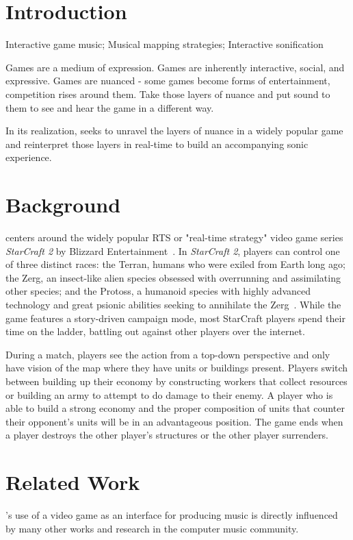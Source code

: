 \documentclass{nime-document-class}
\begin{document}
\section{Introduction}
Interactive game music; Musical mapping strategies; Interactive sonification

Games are a medium of expression. Games are inherently interactive, social, and expressive. Games are nuanced - some games become forms of entertainment, competition rises around them. Take those layers of nuance and put sound to them to see and hear the game in a different way. 

In its realization, \projectName{} seeks to unravel the layers of nuance in a widely popular game and reinterpret those layers in real-time to build an accompanying sonic experience. 

\section{Background}
\projectName{} centers around the widely popular RTS or "real-time strategy" video game series {\em StarCraft 2} by Blizzard Entertainment~\cite{Blizzard:2013:Online}.
In {\em StarCraft 2}, players can control one of three distinct races: the Terran, humans who were exiled from Earth long ago; the Zerg, an insect-like alien species obsessed with overrunning and assimilating other species; and the Protoss, a humanoid species with highly advanced technology and great psionic abilities seeking to annihilate the Zerg~\cite{BlizzardRaces:2013:Online}.
While the game features a story-driven campaign mode, most StarCraft players spend their time on the ladder, battling out against other players over the internet. 

During a match, players see the action from a top-down perspective and only have vision of the map where they have units or buildings present.
Players switch between building up their economy by constructing workers that collect resources or building an army to attempt to do damage to their enemy.
A player who is able to build a strong economy and the proper composition of units that counter their opponent's units will be in an advantageous position.
The game ends when a player destroys the other player's structures or the other player surrenders.

\section{Related Work}
\projectName{}'s use of a video game as an interface for producing music is directly influenced by many other works and research in the computer music community.
\end{document}
